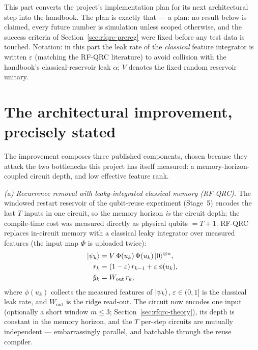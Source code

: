 
This part converts the project's implementation plan for its next
architectural step into the handbook. The plan is exactly that --- a plan:
no result below is claimed, every future number is simulation unless scoped
otherwise, and the success criteria of Section~\ref{sec:rfqrc-prereg} were
fixed before any test data is touched. Notation: in this part the leak rate
of the \emph{classical} feature integrator is written $\varepsilon$
(matching the RF-QRC literature) to avoid collision with the handbook's
classical-reservoir leak $\alpha$; $V$ denotes the fixed random reservoir
unitary.

\section{The architectural improvement, precisely stated}
\label{sec:rfqrc-statement}

The improvement composes three published components, chosen because they
attack the two bottlenecks this project has itself measured: a
memory-horizon-coupled circuit depth, and low effective feature rank.

\emph{(a) Recurrence removal with leaky-integrated classical memory
(RF-QRC).} The windowed restart reservoir of the qubit-reuse experiment
(Stage~5) encodes the last $T$ inputs in one circuit, so the memory horizon
\emph{is} the circuit depth; the compile-time cost was measured directly as
physical qubits $=T{+}1$. RF-QRC \citep{ahmed2024prediction} replaces
in-circuit memory with a classical leaky integrator over measured features
(the input map $\Phi$ is uploaded twice):
\begin{align}
|\psi_k\rangle &= V\,\Phi(u_k)\,\Phi(u_k)\,|0\rangle^{\otimes n},\label{eq:rfqrc-step}\\
r_k &= (1-\varepsilon)\,r_{k-1} + \varepsilon\,\phi(u_k),\label{eq:rfqrc-leak}\\
\hat y_k &= W_{\mathrm{out}}\, r_k,\nonumber
\end{align}
where $\phi(u_k)$ collects the measured features of $|\psi_k\rangle$,
$\varepsilon\in(0,1]$ is the classical leak rate, and $W_{\mathrm{out}}$ is the
ridge read-out. The
circuit now encodes one input (optionally a short window $m\le 3$;
Section~\ref{sec:rfqrc-theory}), its depth is constant in the memory
horizon, and the $T$ per-step circuits are mutually independent ---
embarrassingly parallel, and batchable through the reuse compiler.

